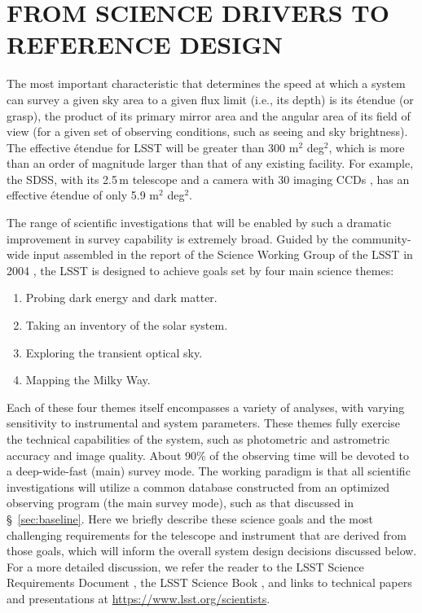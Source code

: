 \section{  FROM SCIENCE DRIVERS TO REFERENCE DESIGN}
\label{Sec:refdesign}

The most important characteristic that determines the speed at which a system can
survey a given sky area to a given flux limit (i.e., its depth) is its \'etendue
(or grasp), the product of its primary mirror area and the angular
area of its field of view (for a given set of observing conditions, such as
seeing and sky brightness).
The effective \'etendue for LSST will be greater than 300 m$^2$ deg$^2$, which
is more than an order of magnitude larger than that of any existing facility.
For example, the SDSS, with its 2.5\,m telescope \citep{2006AJ....131.2332G} and a
camera with 30 imaging CCDs \citep{1998AJ....116.3040G}, has an effective \'etendue of
only 5.9 m$^2$ deg$^2$.

The range of scientific investigations that will be enabled by such a
dramatic improvement in survey capability is extremely broad. Guided by
the community-wide input assembled in the report of the Science Working Group of the
LSST in 2004 \citep{Document-26952}, the LSST is designed to
achieve goals set by four main science themes:

\begin{enumerate}
\item Probing dark energy and dark matter.
\item Taking an inventory of the solar system.
\item Exploring the transient optical sky.
\item Mapping the Milky Way.
\end{enumerate}

Each of these four themes itself encompasses a variety of analyses, with
varying sensitivity to instrumental and system parameters. These themes
fully exercise the technical capabilities of the system, such as photometric
and astrometric accuracy and image quality. About 90\% of the observing time
will be devoted to a deep-wide-fast (main) survey mode. The working paradigm is that all
scientific investigations will utilize a common database constructed from an optimized
observing program (the main survey mode), such as that discussed in
\S~\ref{sec:baseline}.
Here we briefly describe these science goals and the most challenging requirements for the
telescope and instrument that are derived from those goals, which will
inform the overall system design decisions discussed below.
For a more detailed discussion, we refer the reader to the LSST Science Requirements
Document \citep[SRD;][]{LPM-17}, the LSST Science Book
\citep[][hereafter SciBook]{2009arXiv0912.0201L},
and links to technical papers and presentations at
\url{https://www.lsst.org/scientists}.



